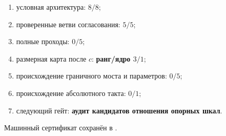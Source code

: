 \begin{protocol}\begin{enumerate}
\item условная архитектура: \textbf{$8/8$};
\item проверенные ветви согласования: \textbf{$5/5$};
\item полные проходы: \textbf{$0/5$};
\item размерная карта после $c$: \textbf{ранг/ядро $3/1$};
\item происхождение граничного моста и параметров: \textbf{$0/5$};
\item происхождение абсолютного такта: \textbf{$0/1$};
\item следующий гейт: \textbf{аудит кандидатов отношения опорных шкал}.
\end{enumerate}\end{protocol}

Машинный сертификат сохранён в
.